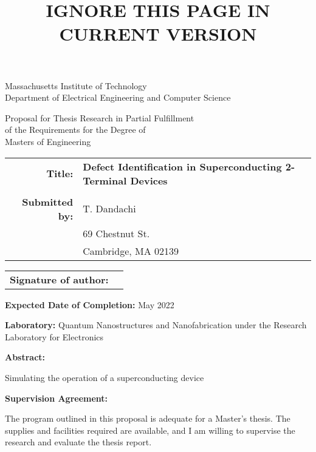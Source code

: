 \documentclass[]{article}
\title{IGNORE THIS PAGE IN CURRENT VERSION}
\newcommand{\listoftodos}[2][]{}
\begin{document}

\doublespacing

\maketitle

\begin{center}
    Massachusetts Institute of Technology \\
    Department of Electrical Engineering and Computer Science
\end{center}

\begin{center}
    Proposal for Thesis Research in Partial Fulfillment\\ of the Requirements for the Degree of\\
Masters of Engineering
\end{center}

\vfill

\begin{tabular}{rl}
\textbf{Title:} & \textbf{Defect Identification in Superconducting 2-Terminal Devices} \\
\\
\textbf{Submitted by:} & T. Dandachi \\
              & 69 Chestnut St. \\
              & Cambridge, MA 02139
\end{tabular}

\vspace{15mm}
\begin{tabular}{@{}p{1.5in}p{4in}@{}}
\textbf{Signature of author:} & \hrulefill \\
\end{tabular}

\vfill

\textbf{Expected Date of Completion:} May 2022

\vfill

\textbf{Laboratory:} Quantum Nanostructures and Nanofabrication under the Research Laboratory for Electronics

\vfill

\textbf{Abstract:}

Simulating the operation of a superconducting device

\vfill

\textbf{Supervision Agreement:}

The program outlined in this proposal is adequate for a Master's thesis. The supplies and facilities required are available, and I am willing to supervise the research and evaluate the thesis report.
\end{document}
